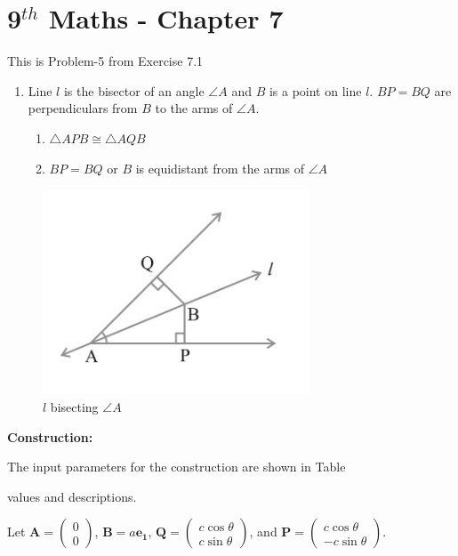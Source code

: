 \documentclass[10pt]{article}
\newcommand{\myvec}[1]{\ensuremath{\begin{pmatrix}#1\end{pmatrix}}}
\let\vec\mathbf
\begin{document}
\section*{9$^{th}$ Maths - Chapter 7}
This is Problem-5 from Exercise 7.1

\begin{enumerate}
\item Line $l$ is the bisector of an angle $\angle{A}$ and $B$ is a point on line $l$. $BP = BQ$ are perpendiculars from $B$ to the arms of $\angle{A}$. 
\begin{enumerate}
\item $\triangle{APB} \cong \triangle{AQB}$
\item $BP = BQ$ or $B$ is equidistant from the arms of $\angle{A}$
\end{enumerate}
\end{enumerate}
\begin{figure}[H]
    \begin{center}
    \includegraphics[width=80mm]{figs/QAPB.png}
    \caption{$l$ bisecting $\angle{A}$}
    \label{triangle BAQ  and BAP }   
\end{center}
\end{figure}
\textbf{Construction:}

The input parameters for the construction are shown in Table
\begin{center}
\begin{table}[h]
 \renewcommand{\arraystretch}{1.5}
 \centering
 
 \caption{ values and descriptions.}
 \label{tab:symbols}
\end{table}
\end{center}
	

Let $\vec{A} = \myvec{0\\0}$, $\vec{B} = a\vec{e_1}$, $\vec{Q} = \myvec{c\cos\theta\\c\sin\theta}$, and $\vec{P} = \myvec{c\cos\theta\\-c\sin\theta}$.
\end{document}

